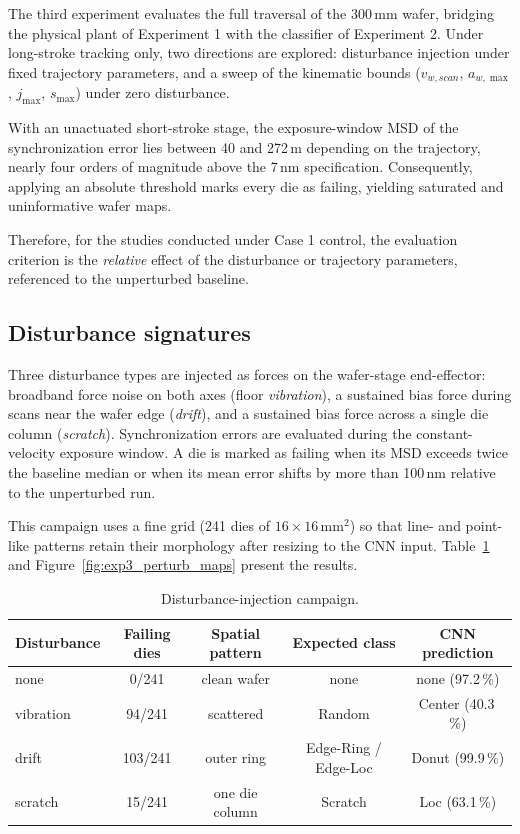 The third experiment evaluates the full traversal of the 300\,mm wafer, bridging the physical plant of Experiment 1 with the classifier of Experiment 2. Under long-stroke tracking only, two directions are explored: disturbance injection under fixed trajectory parameters, and a sweep of the kinematic bounds ($v_{w,scan}$, $a_{w,\max}$, $j_{\max}$, $s_{\max}$) under zero disturbance.

With an unactuated short-stroke stage, the exposure-window MSD of the synchronization error lies between 40 and 272\,\textmu m depending on the trajectory, nearly four orders of magnitude above the 7\,nm specification. Consequently, applying an absolute threshold marks every die as failing, yielding saturated and uninformative wafer maps.

Therefore, for the studies conducted under Case 1 control, the evaluation criterion is the \textit{relative} effect of the disturbance or trajectory parameters, referenced to the unperturbed baseline.

\subsection{Disturbance signatures}\label{sec:exp_perturb}

Three disturbance types are injected as forces on the wafer-stage end-effector: broadband force noise on both axes (floor \textit{vibration}), a sustained bias force during scans near the wafer edge (\textit{drift}), and a sustained bias force across a single die column (\textit{scratch}). Synchronization errors are evaluated during the constant-velocity exposure window. A die is marked as failing when its MSD exceeds twice the baseline median or when its mean error shifts by more than 100\,nm relative to the unperturbed run.

This campaign uses a fine grid (241 dies of $16\times16$\,mm$^2$) so that line- and point-like patterns retain their morphology after resizing to the CNN input. Table~\ref{tab:exp3_perturb} and Figure~\ref{fig:exp3_perturb_maps} present the results.

\begin{table}[htbp]
\centering
\caption{Disturbance-injection campaign.}
\label{tab:exp3_perturb}
\begin{tabular}{lcccc}
\toprule
Disturbance & Failing dies & Spatial pattern & Expected class & CNN prediction \\
\midrule
none        & 0/241   & clean wafer     & none      & none (97.2\,\%) \\
vibration   & 94/241  & scattered       & Random    & Center (40.3\,\%) \\
drift       & 103/241 & outer ring      & Edge-Ring / Edge-Loc & Donut (99.9\,\%) \\
scratch     & 15/241  & one die column  & Scratch   & Loc (63.1\,\%) \\
\bottomrule
\end{tabular}
\end{table}

